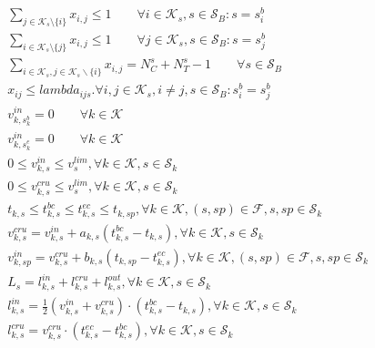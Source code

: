 \begin{align}
  & \sum_{j \in \mathcal{K}_s \setminus \{i\}} x_{i,j} \le 1 \qquad \forall i \in \mathcal{K}_s, s \in \mathcal{S}_B : s = s_{i}^{b} \tag{eq\_0017} \\
  & \sum_{i \in \mathcal{K}_s \setminus \{j\}} x_{i,j} \le 1 \qquad \forall j \in \mathcal{K}_s, s \in \mathcal{S}_B : s = s_{j}^{b} \tag{eq\_0019} \\
  & \sum_{i \in \mathcal{K}_{s}, j \in \mathcal{K}_{s} \backslash \{i\}} x_{i,j} = N_{C}^{s} + N_{T}^{s} - 1 \qquad \forall s \in \mathcal{S}_{B} \tag{eq\_0020} \\
  & x_{i j} \leq \mathit{lambda}_{i j s} . \forall i , j \in \mathcal{K}_{s} , i \neq j , s \in \mathcal{S}_{B} : s_{i}^{b} = s_{j}^{b} \tag{eq\_0021} \\
  & v_{k,s_k^b}^{in} = 0 \qquad \forall k \in \mathcal{K} \tag{eq\_0022} \\
  & v_{k,s_{k}^{e}}^{in} = 0 \qquad \forall k \in \mathcal{K} \tag{eq\_0024} \\
  & 0 \leq v_{k , s}^{i n} \leq v_{s}^{l i m} , \forall k \in \mathcal{K} , s \in \mathcal{S}_{k} \tag{eq\_0025} \\
  & 0 \leq v_{k , s}^{c r u} \leq v_{s}^{l i m} , \forall k \in \mathcal{K} , s \in \mathcal{S}_{k} \tag{eq\_0027} \\
  & t_{k , s} \leq t_{k , s}^{b c} \leq t_{k , s}^{e c} \leq t_{k , sp} , \forall k \in \mathcal{K} , \left(s , sp\right) \in \mathcal{F} , s , sp \in \mathcal{S}_{k} \tag{eq\_0028} \\
  & v_{k , s}^{c r u} = v_{k , s}^{i n} + a_{k , s} \left(t_{k , s}^{b c} - t_{k , s}\right) , \forall k \in \mathcal{K} , s \in \mathcal{S}_{k} \tag{eq\_0029} \\
  & v_{k , sp}^{i n} = v_{k , s}^{c r u} + b_{k , s} \left(t_{k , sp} - t_{k , s}^{e c}\right) , \forall k \in \mathcal{K} , \left(s , sp\right) \in \mathcal{F} , s , sp \in \mathcal{S}_{k} \tag{eq\_0031} \\
  & L_{s} = l_{k , s}^{i n} + l_{k , s}^{c r u} + l_{k , s}^{o u t} , \forall k \in \mathcal{K} , s \in \mathcal{S}_{k} \tag{eq\_0032} \\
  & l_{k , s}^{i n} = \frac{1}{2} \left(v_{k , s}^{i n} + v_{k , s}^{c r u}\right) \cdot \left(t_{k , s}^{b c} - t_{k , s}\right) , \forall k \in \mathcal{K} , s \in \mathcal{S}_{k} \tag{eq\_0033} \\
  & l_{k , s}^{c r u} = v_{k , s}^{c r u} \cdot \left(t_{k , s}^{e c} - t_{k , s}^{b c}\right) , \forall k \in \mathcal{K} , s \in \mathcal{S}_{k} \tag{eq\_0035} \\

\end{align}
